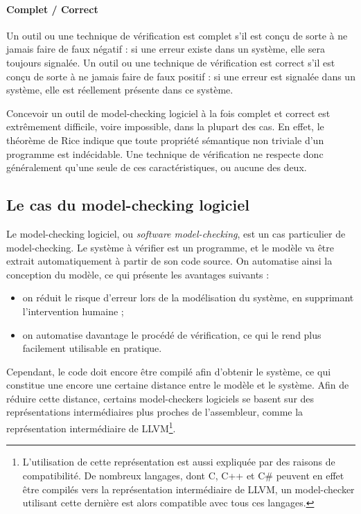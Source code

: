 \paragraph{Complet / Correct}

Un outil ou une technique de vérification est complet s’il est conçu de sorte à
ne jamais faire de faux négatif : si une erreur existe dans un système, elle
sera toujours signalée.
Un outil ou une technique de vérification est correct s’il est conçu de sorte à
ne jamais faire de faux positif : si une erreur est signalée dans un système,
elle est réellement présente dans ce système.

Concevoir un outil de model-checking logiciel à la fois complet et correct est
extrêmement difficile, voire impossible, dans la plupart des cas. En effet, le
théorème de Rice indique que toute propriété sémantique non triviale d'un
programme est indécidable. Une technique de vérification ne respecte donc généralement
qu'une seule de ces caractéristiques, ou aucune des deux.

\subsection{Le cas du model-checking logiciel}

Le model-checking logiciel, ou \emph{software model-checking}, est un cas
particulier de model-checking. Le système à vérifier est un programme, et le
modèle va être extrait automatiquement à partir de son code source.
On automatise ainsi la conception du modèle, ce qui présente les avantages
suivants :

\begin{itemize}
\item
  on réduit le risque d'erreur lors de la modélisation du système,
  en supprimant l'intervention humaine ;
\item
  on automatise davantage le procédé de vérification, ce qui le rend
  plus facilement utilisable en pratique.
\end{itemize}

Cependant, le code doit encore être compilé afin d'obtenir le système,
ce qui constitue une encore une certaine distance entre le modèle et le
système. Afin de réduire cette distance, certains
model-checkers logiciels se basent sur des représentations intermédiaires
plus proches de l'assembleur, comme la représentation intermédiaire de
LLVM\footnote{L'utilisation de cette représentation est aussi expliquée
  par des raisons de compatibilité. De nombreux langages, dont C, C++ et
  C\# peuvent en effet être compilés vers la représentation
  intermédiaire de LLVM, un model-checker utilisant cette dernière est
  alors compatible avec tous ces langages.}.


